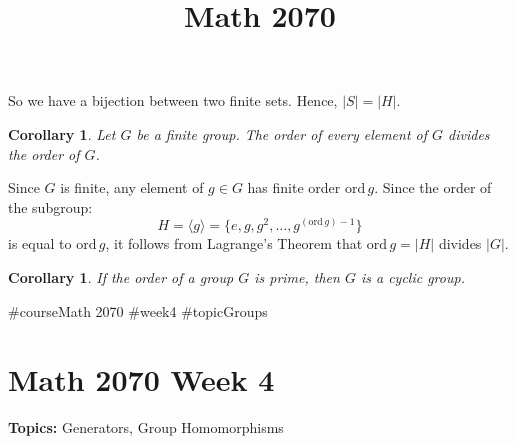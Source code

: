 \documentclass[a4paper,12pt]{report}
\newcommand{\abs}[1]{\left|#1\right|}
\newcommand{\ord}{\mathrm{ord}\,}
\renewcommand{\ord}{\mathrm{ord}\,}
\newcounter{statement}
\numberwithin{statement}{chapter}
\newtheorem{cor}[statement]{Corollary}
\numberwithin{equation}{chapter}
\numberwithin{section}{chapter}
\numberwithin{subsection}{section}
\begin{document}
So we have a bijection between two finite sets.  Hence, $\abs{S} = \abs{H}$.




\begin{cor}
Let $G$ be a finite group.
The order of every element of $G$  divides the order of $G$.
\end{cor}



Since $G$ is finite, any element of $g \in G$ has finite order $\ord g$.
Since the order of the subgroup:
\[
H = \langle g \rangle
= \{e, g, g^2, \ldots, g^{(\ord g) - 1}\}
\]
is equal to $\ord g$,
it follows from Lagrange's Theorem that $\ord g = \abs{H}$ divides $\abs{G}$.



\begin{cor}
If the order of a group $G$ is prime, then $G$ is a cyclic group.
\end{cor}



#course{Math 2070}
#week{4}
#topic{Groups}
\title{Math 2070}
\setcounter{chapter}{4}\setcounter{section}{0}
\setcounter{subsection}{0}
\setcounter{statement}{0}

\chapter*{Math 2070 Week 4}
{\bf Topics: }Generators, Group Homomorphisms
\end{document}
